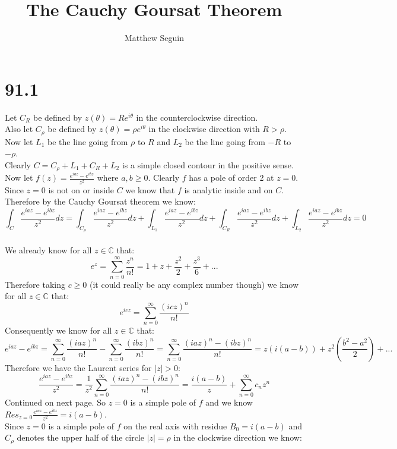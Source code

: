 \documentclass{article}
\title{The Cauchy Goursat Theorem}
\author{Matthew Seguin}
\date{}
\begin{document}
\maketitle

\section*{91.1}
\begin{center}
    \doublespacing
    Let $C_R$ be defined by $z(\theta) = Re^{i\theta}$ in the counterclockwise direction.
    \\Also let $C_{\rho}$ be defined by $z(\theta) =\rho e^{i\theta}$ in the clockwise direction with $R >\rho$.
    \\Now let $L_1$ be the line going from $\rho$ to $R$ and $L_2$ be the line going from $-R$ to $-\rho$.
    \\Clearly $C = C_{\rho} + L_1 + C_R + L_2$ is a simple closed contour in the positive sense.
    \\Now let $f(z) =\frac{e^{iaz} - e^{ibz}}{z^2}$ where $a, b\geq 0$. Clearly $f$ has a pole of order 2 at $z = 0$.
    \\Since $z = 0$ is not on or inside $C$ we know that $f$ is analytic inside and on $C$.
    \\Therefore by the Cauchy Goursat theorem we know:
    \[\int _C\frac{e^{iaz} - e^{ibz}}{z^2} dz =\int _{C_{\rho}}\frac{e^{iaz} - e^{ibz}}{z^2} dz +\int _{L_1}\frac{e^{iaz} - e^{ibz}}{z^2} dz +\int _{C_R}\frac{e^{iaz} - e^{ibz}}{z^2} dz +\int _{L_2}\frac{e^{iaz} - e^{ibz}}{z^2} dz = 0\]
    \\We already know for all $z\in\mathbb{C}$ that:
    \[e^z =\sum _{n=0}^{\infty}\frac{z^n}{n!} = 1 + z +\frac{z^2}{2} +\frac{z^3}{6} + ...\]
    Therefore taking $c\geq 0$ (it could really be any complex number though) we know for all $z\in\mathbb{C}$ that:
    \[e^{icz} =\sum _{n=0}^{\infty}\frac{(icz)^n}{n!}\]
    Consequently we know for all $z\in\mathbb{C}$ that:
    \[e^{iaz} - e^{ibz} =\sum _{n=0}^{\infty}\frac{(iaz)^n}{n!} -\sum _{n=0}^{\infty}\frac{(ibz)^n}{n!} =\sum _{n=0}^{\infty}\frac{(iaz)^n - (ibz)^n}{n!} = z(i(a - b)) + z^2(\frac{b^2 - a^2}{2}) + ...\]
    Therefore we have the Laurent series for $|z| > 0$:
    \[\frac{e^{iaz} - e^{ibz}}{z^2} =\frac{1}{z^2}\sum _{n=0}^{\infty}\frac{(iaz)^n - (ibz)^n}{n!} =\frac{i(a - b)}{z} +\sum _{n=0}^{\infty} c_n z^n\]
    \break
    Continued on next page.
    \newpage
    So $z = 0$ is a simple pole of $f$ and we know $Res_{z=0}\frac{e^{iaz} - e^{ibz}}{z^2} = i(a - b)$.
    \\Since $z = 0$ is a simple pole of $f$ on the real axis with residue $B_0 = i(a - b)$ and $C_{\rho}$ denotes the upper half of the circle $|z| =\rho$ in the clockwise direction we know:

\end{center}
\end{document}
